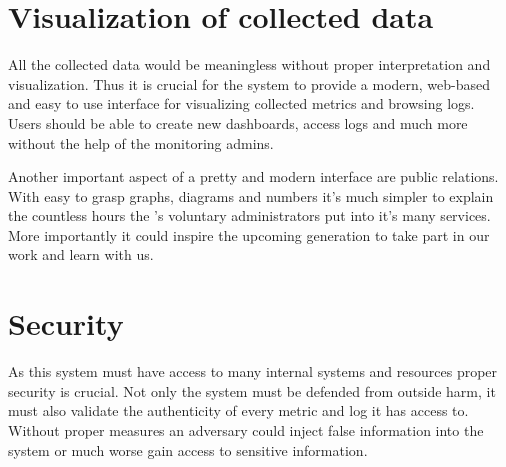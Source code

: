 \section{Visualization of collected data}

All the collected data would be meaningless without proper interpretation and
visualization. Thus it is crucial for the system to provide a modern, web-based
and easy to use interface for visualizing collected metrics and browsing logs.
Users should be able to create new dashboards, access logs and much more
without the help of the monitoring admins.

Another important aspect of a pretty and modern interface are public relations.
With easy to grasp graphs, diagrams and numbers it's much simpler to explain
the countless hours the \kszk's voluntary administrators put into it's many
services. More importantly it could inspire the upcoming generation to take
part in our work and learn with us.

\section{Security}

As this system must have access to many internal systems and resources proper
security is crucial. Not only the system must be defended from outside harm, it
must also validate the authenticity of every metric and log it has access to.
Without proper measures an adversary could inject false information into the
system or much worse gain access to sensitive information.
